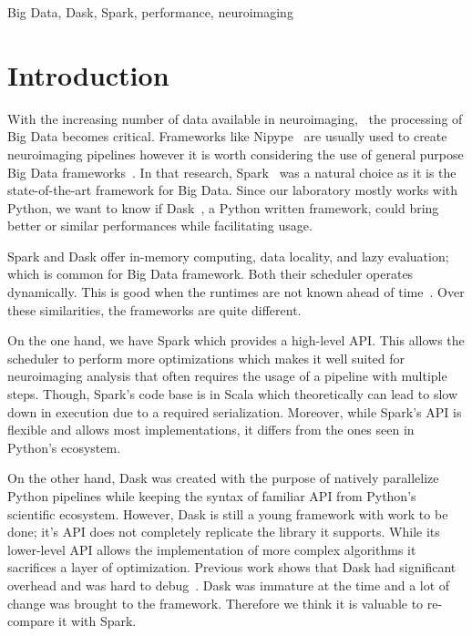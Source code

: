 \documentclass[conference]{IEEEtran}
\begin{document}
\begin{IEEEkeywords}
Big Data, Dask, Spark, performance, neuroimaging
\end{IEEEkeywords}

\section{Introduction}
With the increasing number of data available in neuroimaging,~\cite{ALFAROALMAGRO:18,
UKBioBank:18} the processing of Big Data becomes critical. Frameworks like
Nipype~\cite{Nipype:11} are usually used to create neuroimaging pipelines however it
is worth considering the use of general purpose Big Data
frameworks~\cite{Hayot-Sasson:17}. In that research, Spark~\cite{Spark:16} was a
natural choice as it is the state-of-the-art framework for Big Data. Since our
laboratory mostly works with Python, we want to know if Dask~\cite{Dask:15}, a Python
written framework, could bring better or similar performances while facilitating
usage.

Spark and Dask offer in-memory computing, data locality, and lazy evaluation; which
is common for Big Data framework. Both their scheduler operates dynamically. This is
good when the runtimes are not known ahead of time~\cite{Dask:15}. Over these
similarities, the frameworks are quite different.

On the one hand, we have Spark which provides a high-level API. This allows the
scheduler to perform more optimizations which makes it well suited for neuroimaging
analysis that often requires the usage of a pipeline with multiple steps. Though,
Spark's code base is in Scala which theoretically can lead to slow down in execution
due to a required serialization. Moreover, while Spark's API is flexible and allows
most implementations, it differs from the ones seen in Python's ecosystem.

On the other hand, Dask was created with the purpose of natively parallelize Python
pipelines while keeping the syntax of familiar API from Python's scientific
ecosystem. However, Dask is still a young framework with work to be done; it's API
does not completely replicate the library it supports. While its lower-level API
allows the implementation of more complex algorithms it sacrifices a layer of
optimization.
Previous work shows that Dask had significant overhead and was
hard to debug~\cite{Mehta:17}.
Dask was immature at the time and a lot of change was brought to the framework.
Therefore we think it is valuable to re-compare it with Spark.
\end{document}
